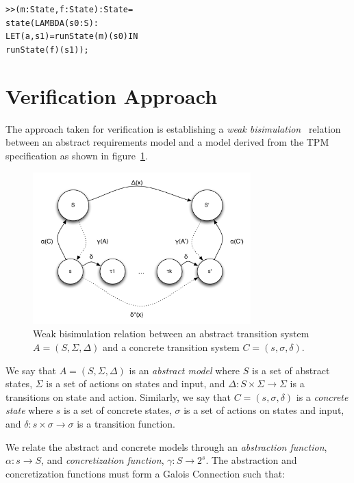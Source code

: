 \documentclass[10pt]{article}
\begin{document}
\begin{alltt}
 >> (m:State,f:State):State =
   state(LAMBDA(s0:S):
          LET (a,s1) = runState(m)(s0) IN
            runState(f)(s1));
\end{alltt}

\section{Verification Approach}

The approach taken for verification is establishing a \emph{weak
  bisimulation}~\citep{Sangiorgi:12:Introduction-to} relation between
an abstract requirements model and a model derived from the TPM
specification as shown in figure~\ref{fig:bisimulation}.

\begin{figure}[hbtp]
  \centering
  \includegraphics[width=0.75\textwidth]{figures/bisimulation.pdf}
  \caption{Weak bisimulation relation between an abstract transition
    system $A=(S,\Sigma,\Delta)$ and a concrete transition system
    $C=(s,\sigma,\delta)$.}
  \label{fig:bisimulation} 
\end{figure}

We say that $A=(S,\Sigma,\Delta)$ is an \emph{abstract model} where
$S$ is a set of abstract states, $\Sigma$ is a set of actions on
states and input, and $\Delta : S\times\Sigma\rightarrow\Sigma$ is a
transitions on state and action.  Similarly, we say that
$C=(s,\sigma,\delta)$ is a \emph{concrete state } where $s$ is a set
of concrete states, $\sigma$ is a set of actions on states and input,
and $\delta : s\times\sigma\rightarrow\sigma$ is a transition
function.

We relate the abstract and concrete models through an \emph{abstraction
function}, $\alpha:s\rightarrow S$, and \emph{concretization
function}, $\gamma:S\rightarrow 2^s$.  The abstraction and
concretization functions must form a Galois Connection such that:
\end{document}
